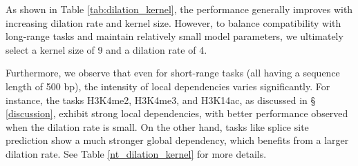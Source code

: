 As shown in Table \ref{tab:dilation_kernel}, the performance generally improves with increasing dilation rate and kernel size. However, to balance compatibility with long-range tasks and maintain relatively small model parameters, we ultimately select a kernel size of 9 and a dilation rate of 4.

\begin{table}[h]
\centering
\caption{Performance of different kernel sizes and dilation rates across 18 tasks in the NT benchmark. The values represent the average performance for all tasks.}
\label{tab:dilation_kernel}
\end{table}

Furthermore, we observe that even for short-range tasks (all having a sequence length of 500 bp), the intensity of local dependencies varies significantly. For instance, the tasks H3K4me2, H3K4me3, and H3K14ac, as discussed in %
\S 
\ref{discussion}, exhibit strong local dependencies, with better performance observed when the dilation rate is small. On the other hand, tasks like splice site prediction show a much stronger global dependency, which benefits from a larger dilation rate. See Table \ref{nt_dilation_kernel} for more details.

